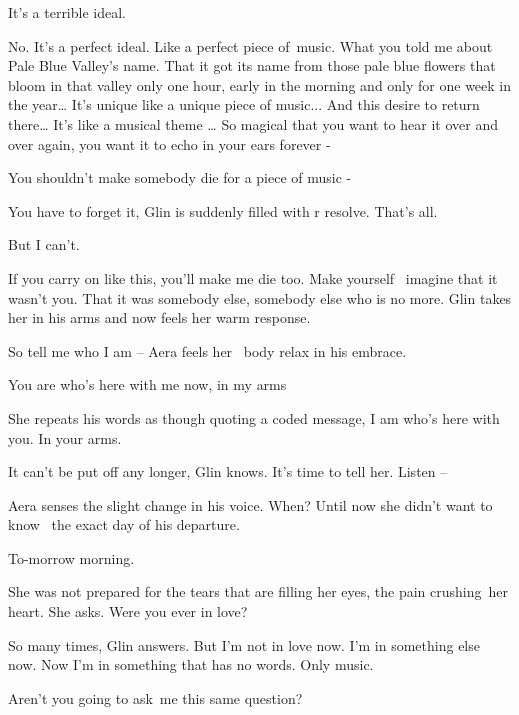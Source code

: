 \documentclass[12pt]{book}
\begin{document}
{\textquotedbl}It's a terrible ideal.{\textquotedbl}

{\textquotedbl}No. It's a perfect ideal. Like a perfect piece of~music. What you told me about Pale Blue Valley's name.
That it got its name from those pale blue flowers that bloom in that valley only one hour, early in the morning and
only for one week in the year{\dots} It's unique like a unique piece of music... And this desire to return there{\dots}
It's like a musical theme {\dots} So magical that you want to hear it over and over again, you want it to echo in your
ears forever -{\textquotedbl}

{\textquotedbl}You shouldn't make somebody die for a piece of music -{\textquotedbl}

{\textquotedbl}You have to forget it,{\textquotedbl} Glin is suddenly filled with r resolve. {\textquotedbl}That's
all.{\textquotedbl}

{\textquotedbl}But I can't.{\textquotedbl}

{\textquotedbl}If you carry on like this, you'll make me die too. Make{ }yourself{
\ }imagine that it wasn't you. That it was somebody else, somebody else who is no more.{\textquotedbl} Glin takes her
in his arms and now feels her warm response.

{\textquotedbl}So tell me who I am -- {\textquotedbl} Aera feels her \ body relax in his embrace.

{\textquotedbl}You are who's here with me now, in my arms{\textquotedbl}

She repeats his words as though quoting a coded message, {\textquotedbl}I am who's here with you. In your
arms.{\textquotedbl}

It can't be put off any longer, Glin knows. It's time to tell her. {\textquotedbl}Listen --{\textquotedbl}

Aera senses the slight change in his voice. {\textquotedbl}When?{\textquotedbl} Until now she didn't want to know \ the
exact day of his departure.

{\textquotedbl}To-morrow morning.{\textquotedbl}

She was not prepared for the tears that are filling her eyes, the pain crushing~her heart. She asks. {\textquotedbl}Were
you ever in love?{\textquotedbl}

{\textquotedbl}So many times,{\textquotedbl} Glin answers. {\textquotedbl}But I'm not in love now. I'm in something else
now. Now I'm in something that has no words. Only music.{\textquotedbl} ~

{\textquotedbl}Aren't you going to ask~me this same question?{\textquotedbl}
\end{document}
